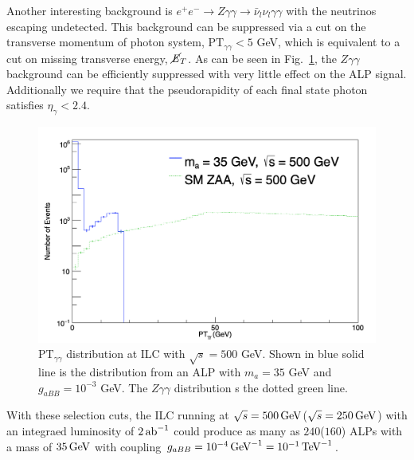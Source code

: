 \documentclass[aps,onecolumn,twoside,secnumarabic,12pt,balancelastpage,amsmath,amssymb,nofootinbib,hyperref=pdftex]{revtex4}
\begin{document}
\vskip 0.12in
Another interesting background is $e^{+}e^{-} \rightarrow Z\gamma\gamma \rightarrow \bar{\nu}_{l}\nu_{l}\gamma\gamma$ with the neutrinos escaping undetected. This background can be suppressed via a cut on the transverse momentum of photon system, $\text{PT}_{\gamma\gamma} < 5$ GeV, which is equivalent to a cut on missing transverse energy, $\cancel{\it{E}}_{T}$. As can be seen in Fig.~\ref{fig:PTaa}, the $Z\gamma\gamma$ background can be efficiently suppressed with very little effect on the ALP signal. Additionally we require that the pseudorapidity of each final state photon satisfies $\eta_{\gamma} < 2.4$.
 \begin{figure}[t]
\begin{center}
\includegraphics[width=13cm]{PTaa.png}
\caption{$\text{PT}_{\gamma\gamma}$ distribution at ILC with $\sqrt{s} = 500$ GeV. Shown in blue solid line is the distribution from an ALP with $m_{a} = 35$ GeV and $g_{aBB} = 10^{-3}$ GeV. The $Z\gamma\gamma$ distribution s the dotted green line.}
\label{fig:PTaa}
\end{center}
\end{figure}
With these selection cuts, the ILC running at $\sqrt{s} = 500\,\rm{GeV}$($\sqrt{s} = 250\,\rm{GeV}$) with an integraed luminosity of $2\,\rm{ab}^{-1}$ could produce as many as $240$($160$) ALPs with a mass of $35\,\rm{GeV}$ with coupling $g_{aBB} = 10^{-4}\,\rm{GeV}^{-1} = 10^{-1}\,\rm{TeV}^{-1}$.
\end{document}
